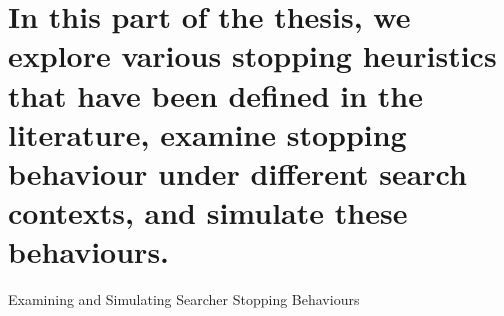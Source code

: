 
\part[Stopping Behaviours and Context]{In this part of the thesis, we explore various stopping heuristics that have been defined in the literature, examine stopping behaviour under different search contexts, and simulate these behaviours.}{Examining and Simulating Searcher Stopping Behaviours}\label{part:stopping}